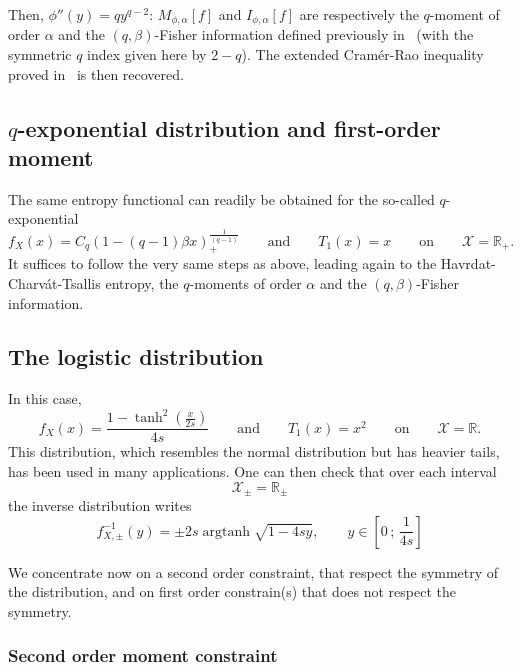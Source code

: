 \documentclass[english,sort&compress]{elsarticle}
\theoremstyle{definition}
\theoremstyle{plain}
\theoremstyle{plain}
\def\Rset{\mathbb{R}}
\def\X{\mathcal{X}}
\def\argtanh{\operatorname{argtanh}}
\begin{document}
Then, $\phi''(y) = q y^{q-2}$: $M_{\phi,\alpha}[f]$ and $I_{\phi,\alpha}[f]$ are
respectively  the  $q$-moment  of  order  $\alpha$  and  the  $(q,\beta)$-Fisher
information defined previously in~\cite{Ber12:06_1, Ber12:06_2, Ber13} (with the
symmetric $q$ index  given here by $2-q$). The  extended Cram\'er-Rao inequality
proved in~\cite{Ber12:06_2, Ber13} is then recovered.



\subsection{$q$-exponential distribution and first-order moment}
\label{subsec:qExponentialFirstOrder}

The  same  entropy  functional  can   readily  be  obtained  for  the  so-called
$q$-exponential
% 
\[
f_X(x)  =  C_q \left(  1  -  (q-1)  \beta x  \right)_+^{\frac{1}{(q-1)}}  \qquad
\mbox{and} \qquad T_1(x) = x \qquad \mbox{on} \qquad \X = \Rset_+.
\]
%
It  suffices to  follow  the very  same steps  as  above, leading  again to  the
Havrdat-Charv\'at-Tsallis  entropy, the  $q$-moments of  order $\alpha$  and the
$(q,\beta)$-Fisher information.



\subsection{The logistic distribution}
\label{subsec:Logistic}

In this case, 
%
\[
f_X(x)  = \frac{1  -  \tanh^2\!\left(\frac{x}{2s}\right)}{4s} \qquad  \mbox{and}
\qquad T_1(x) = x^2 \qquad \mbox{on} \qquad \X = \Rset.
\]
This  distribution, which  resembles  the normal  distribution  but has  heavier
tails, has  been used in  many applications. One  can then check that  over each
interval
%
\[
\X_\pm = \Rset_\pm
\]
%
the inverse distribution writes 
%
\[
f_{X,\pm}^{-1}(y) = \pm 2 s \argtanh \sqrt{1-4sy}, \qquad y \in \left[ 0 \, ; \,
  \frac{1}{4s} \right]
\]

We concentrate  now on a second  order constraint, that respect  the symmetry of
the  distribution, and on  first order  constrain(s) that  does not  respect the
symmetry.



\subsubsection{Second order moment constraint}
\end{document}
